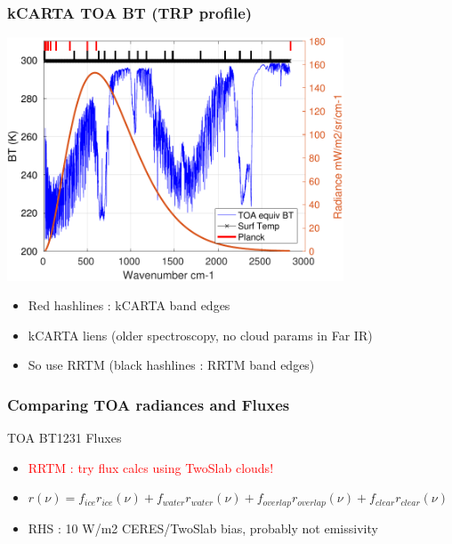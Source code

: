 \documentclass[10pt,t]{beamer}
\begin{document}
\begin{frame}
  \frametitle{kCARTA TOA BT (TRP profile)}

  \begin{center}
    \noindent\includegraphics[width=0.75\textwidth]{Figs/generic_planckTOABT.pdf}
  \end{center}

  \begin{itemize}  
  \item Red hashlines : kCARTA band edges
  \item kCARTA liens (older spectroscopy, no cloud params in Far IR)
  \item So use RRTM (black hashlines : RRTM band edges)
  \end{itemize}

\end{frame}
\begin{frame}
  \frametitle{Comparing TOA radiances and Fluxes}

  \hspace{0.50in} TOA BT1231 \hspace{1.75in} Fluxes \\
  \begin{center}
  \end{center}

  \begin{itemize}
  \item \textcolor{red}{RRTM : try flux calcs using TwoSlab clouds!}
  \item \begin{small}$r(\nu) = f_{ice} r_{ice}(\nu) + f_{water} r_{water}(\nu) +
    f_{overlap} r_{overlap}(\nu) + f_{clear} r_{clear}(\nu)$ \end{small}
  \item RHS : 10 W/m2 CERES/TwoSlab bias, probably not emissivity
  \end{itemize}
\end{frame}
\end{document}
